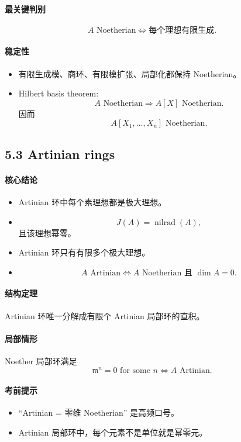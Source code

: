 \documentclass[a4paper]{ctexart}
\begin{document}
\paragraph{最关键判别}
\[
A \text{ Noetherian}
\Longleftrightarrow
\text{每个理想有限生成}.
\]

\paragraph{稳定性}
\begin{itemize}
  \item 有限生成模、商环、有限模扩张、局部化都保持 Noetherian。
  \item Hilbert basis theorem:
  \[
    A \text{ Noetherian} \Rightarrow A[X] \text{ Noetherian}.
  \]
  因而
  \[
    A[X_1,\dots,X_n] \text{ Noetherian}.
  \]
\end{itemize}

\subsection{5.3 Artinian rings}

\paragraph{核心结论}
\begin{itemize}
  \item Artinian 环中每个素理想都是极大理想。
  \item
  \[
    J(A)=\operatorname{nilrad}(A),
  \]
  且该理想幂零。
  \item Artinian 环只有有限多个极大理想。
  \item
  \[
    A \text{ Artinian}
    \Longleftrightarrow
    A \text{ Noetherian 且 } \dim A=0.
  \]
\end{itemize}

\paragraph{结构定理}
Artinian 环唯一分解成有限个 Artinian 局部环的直积。

\paragraph{局部情形}
Noether 局部环满足
\[
\mathfrak m^n=0 \text{ for some } n
\Longleftrightarrow
A \text{ Artinian}.
\]

\paragraph{考前提示}
\begin{itemize}
  \item “Artinian = 零维 Noetherian” 是高频口号。
  \item Artinian 局部环中，每个元素不是单位就是幂零元。
\end{itemize}
\end{document}
